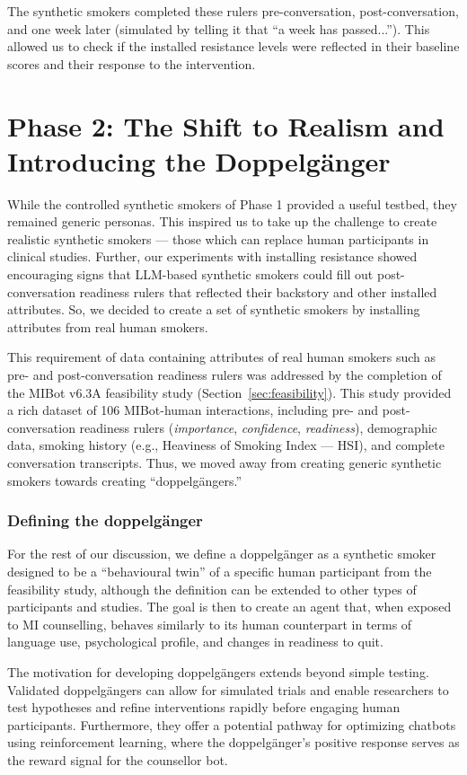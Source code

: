 The synthetic smokers completed these rulers pre-conversation, post-conversation, and one week later (simulated by telling it that ``a week has passed...''). This allowed us to check if the installed resistance levels were reflected in their baseline scores and their response to the intervention.


\section{Phase 2: The Shift to Realism and Introducing the Doppelgänger}
While the controlled synthetic smokers of Phase 1 provided a useful testbed, they remained generic personas. This inspired us to take up the challenge to create realistic synthetic smokers --- those which can replace human participants in clinical studies. Further, our experiments with installing resistance showed encouraging signs that LLM-based synthetic smokers could fill out post-conversation readiness rulers that reflected their backstory and other installed attributes. So, we decided to create a set of synthetic smokers by installing attributes from real human smokers.


This requirement of data containing attributes of real human smokers  such as pre- and post-conversation readiness rulers was addressed by the completion of the MIBot v6.3A feasibility study (Section~\ref{sec:feasibility}). This study provided a rich dataset of 106 MIBot-human interactions, including pre- and post-conversation readiness rulers (\emph{importance}, \emph{confidence}, \emph{readiness}), demographic data, smoking history (e.g., Heaviness of Smoking Index --- HSI), and complete conversation transcripts. Thus, we moved away from creating generic synthetic smokers towards creating ``doppelgängers.''

\subsubsection*{Defining the doppelgänger}
For the rest of our discussion, we define a doppelgänger as a synthetic smoker designed to be a ``behavioural twin'' of a specific human participant from the feasibility study, although the definition can be extended to other types of participants and studies. The goal is then to create an agent that, when exposed to MI counselling, behaves similarly to its human counterpart in terms of language use, psychological profile, and changes in readiness to quit.

The motivation for developing doppelgängers extends beyond simple testing. Validated doppelgängers can allow for simulated trials and enable researchers to test hypotheses and refine interventions rapidly before engaging human participants. Furthermore, they offer a potential pathway for optimizing chatbots using reinforcement learning, where the doppelgänger's positive response serves as the reward signal for the counsellor bot.

